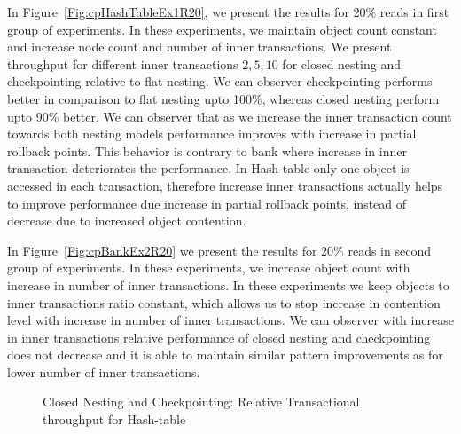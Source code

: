 \documentclass[12pt,english]{report}
\begin{document}
In Figure~\ref{Fig:cpHashTableEx1R20}, we present the results for 20\% reads in first group of experiments. In these experiments, we maintain object count constant and increase node count and number of inner transactions. We present throughput for different inner transactions ${2, 5, 10}$ for closed nesting and checkpointing relative to flat nesting. We can observer checkpointing performs better in comparison to flat nesting upto 100\%, whereas closed nesting perform upto 90\% better. We can observer that as we increase the inner transaction count towards both nesting models performance improves with increase in partial rollback points. This behavior is contrary to bank where increase in inner transaction deteriorates the performance. In Hash-table only one object is accessed in each transaction, therefore increase inner transactions actually helps to improve performance due increase in partial rollback points, instead of decrease due to increased object contention.

In Figure~\ref{Fig:cpBankEx2R20} we present the results for 20\% reads in second group of experiments. In these experiments, we increase object count with increase in number of inner transactions. In these experiments we keep objects to inner transactions ratio constant, which allows us to stop increase in contention level with increase in number of inner transactions. We can observer with increase in inner transactions relative performance of closed nesting and checkpointing does not decrease and it is able to maintain similar pattern improvements as for lower number of inner transactions.

\begin{figure}[H]
\centering
{}
\end{figure}
\begin{figure}[H]
\centering
{}
\end{figure}
\begin{figure}[H]
\centering
{}
\caption{Closed Nesting and Checkpointing: Relative Transactional throughput for Hash-table}
\label{Fig:cpHashTable}
\end{figure}
\end{document}
